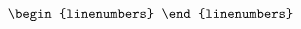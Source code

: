 \documentclass[10pt]{article}
\begin{document}
\[\begin{linenumbers}
%
%
%

\end{linenumbers}\]
\end{document}
